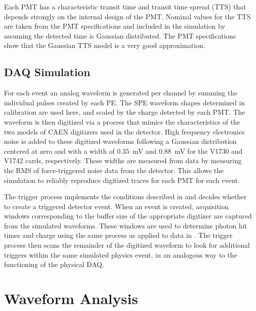 Each PMT has a characteristic transit time and transit time spread (TTS) that depends strongly on the internal design of the PMT. 
Nominal values for the TTS are taken from the PMT specifications and included in the simulation by assuming the detected time is Gaussian distributed.
The PMT specifications~\cite{h11934} show that the Gaussian TTS model is a very good approximation.

\subsection{DAQ Simulation \label{sec:daq_sim}}

For each event an analog waveform is generated per channel by summing the individual pulses created by each PE.
The SPE waveform shapes determined in calibration are used here, and scaled by the charge detected by each PMT.
The waveform is then digitized via a process that mimics the characteristics of the two models of CAEN digitizers used in the detector. 
High frequency electronics noise is added to these digitized waveforms following a Gaussian distribution centered at zero and with a width of $0.35$~mV and $0.88$~mV for the V1730 and V1742 cards, respectively.
These widths are measured from data by measuring the RMS of force-triggered noise data from the detector.
This allows the simulation to reliably reproduce digitized traces for each PMT for each event.

The trigger process implements the conditions described in  and decides whether to create a triggered detector event. 
When an event is created, acquisition windows corresponding to the buffer size of the appropriate digitizer are captured from the simulated waveforms.
These windows are used to determine photon hit times and charge using the same process as applied to data in .  
The trigger process then scans the remainder of the digitized waveform to look for additional triggers within the same simulated physics event, in an analogous way to the functioning of the physical DAQ.


\section{Waveform Analysis}\label{s:analysis}

